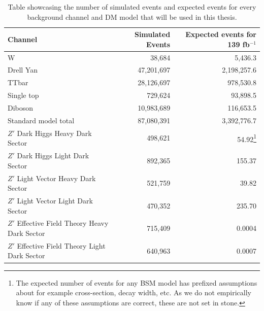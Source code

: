 \documentclass[12pt, a4paper]{book}
\begin{document}
\begin{table}[!h]
   \centering
    \caption[Dataset used for ML]{Table showcasing the number of simulated events and expected events for every background channel and DM model that will be used in this thesis.}
   \begin{tabular}{l|r|r}\midrule\midrule
      Channel                                                                         & Simulated Events            & Expected events for 139 fb$^{-1}$ \\\midrule
      W                                                                               & 38,684                & 5,436.3        \\
      Drell Yan                                                                       & 47,201,697            & 2,198,257.6    \\
      TTbar                                                                           & 28,126,697            & 978,530.8      \\
      Single top                                                                      & 729,624               & 93,898.5       \\
      Diboson                                                                         & 10,983,689            & 116,653.5      \\\midrule
      Standard model total                                                            & 87,080,391            & 3,392,776.7    \\\midrule
      $Z'$ Dark Higgs Heavy Dark Sector                                               & 498,621               & 54.92\footnote{The expected number of events for any BSM model has prefixed assumptions about for example cross-section, decay width, etc. As we do not empirically know if any of these assumptions are correct, these are not set in stone.}         \\
      $Z'$ Dark Higgs Light Dark Sector                                               & 892,365               & 155.37         \\
      $Z'$ Light Vector Heavy Dark Sector                                             & 521,759               & 39.82         \\
      $Z'$ Light Vector Light Dark Sector                                             & 470,352               & 235.70         \\
      $Z'$ Effective Field Theory Heavy Dark Sector                                   & 715,409               & 0.0004           \\
      $Z'$ Effective Field Theory Light Dark Sector                                   & 640,963               & 0.0007          \\\midrule\midrule
   \end{tabular}
   \label{tab:dataset}
\end{table}
\end{document}
